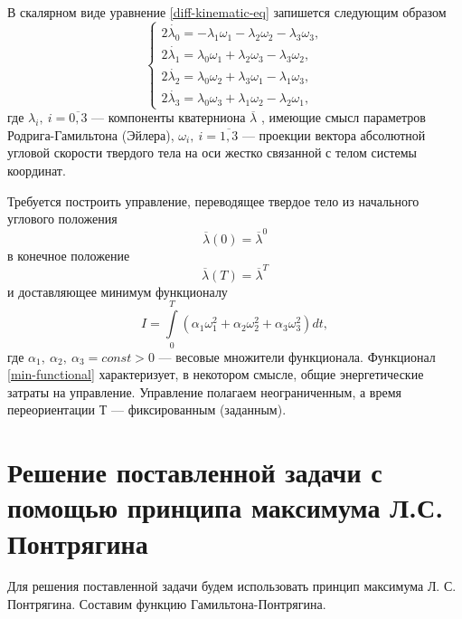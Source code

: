\documentclass[14pt]{extreport}
\begin{document}
В скалярном виде уравнение \eqref{diff-kinematic-eq} запи­шется следующим образом
\begin{equation}
\label{diff-kinematic-eq-scal}
\begin{cases}
	2\dot{\lambda_{0}} = -\lambda_{1}\omega_{1} - \lambda_{2}\omega_{2} - \lambda_{3}\omega_{3},\\
	2\dot{\lambda_{1}} = \lambda_{0}\omega_{1} + \lambda_{2}\omega_{3} - \lambda_{3}\omega_{2},\\
	2\dot{\lambda_{2}} = \lambda_{0}\omega_{2} + \lambda_{3}\omega_{1} - \lambda_{1}\omega_{3},\\
	2\dot{\lambda_{3}} = \lambda_{0}\omega_{3} + \lambda_{1}\omega_{2} - \lambda_{2}\omega_{1},
\end{cases}
\end{equation}
где $\lambda_{i},\ i=\overline{0,3}$ — компоненты кватерниона $\overline{\lambda}$ , имеющие смысл пара­метров Родрига-Гамильтона (Эйлера), $\omega_{i},\ i=\overline{1,3}$ — проекции вектора абсолютной угловой скорости твердого тела на оси жестко связанной с те­лом системы координат. 

Требуется построить управление, переводящее твердое тело из начального углового положения
\begin{equation}
\label{init-angular-position}
\overline{\lambda}(0) = \overline{\lambda}^{0}
\end{equation}
в конечное положение
\begin{equation}
\label{fin-angular-position}
\overline{\lambda}(T) = \overline{\lambda}^{T}
\end{equation}
и доставляющее минимум функционалу
\begin{equation}
\label{min-functional}
I = \int \limits_{0}^{T} (\alpha_{1}\omega_{1}^{2}+\alpha_{2}\omega_{2}^{2}+\alpha_{3}\omega_{3}^{2}) dt,
\end{equation}
где $\alpha_{1},\ \alpha_{2},\ \alpha_{3} = const > 0$ — весовые множители функционала. Функционал \eqref{min-functional} характеризует, в некотором смысле, общие энергетические затраты на управление. Управление полагаем неограниченным, а время переориентации Т — фиксированным (заданным).

\chapter{Решение поставленной задачи с помощью принципа максимума Л.С. Понтрягина}
Для решения поставленной задачи будем использовать принцип макси­мума Л. С. Понтрягина. Составим функцию Гамильтона-Понтрягина.
\end{document}
